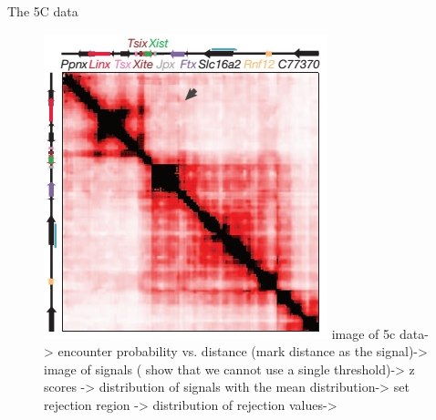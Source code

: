 \documentclass[8pt]{beamer}
\begin{document}
\begin{frame}{The 5C data}
\begin{figure}[H]
\includegraphics[scale=0.3]{tadDandENoraEtAl2012}
 image of 5c data-> encounter probability vs. distance (mark distance as the signal)-> image of signals ( show that we cannot use a single threshold)-> z scores -> distribution of signals with the mean distribution-> set rejection region -> distribution of rejection values-> 
\end{figure}

\end{frame}
\end{document}
